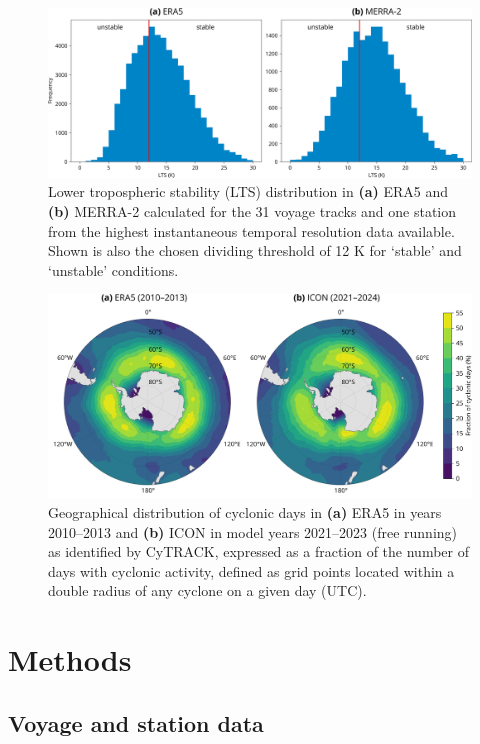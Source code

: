 \documentclass[12pt,a4paper]{article}
\begin{document}
\begin{figure}
\centering
\includegraphics[width=\textwidth]{img/lts_dist.pdf}
\caption{
Lower tropospheric stability (LTS) distribution in \textbf{(a)} ERA5 and
\textbf{(b)} MERRA-2 calculated for the 31 voyage tracks and one station from
the highest instantaneous temporal resolution data available. Shown is also the
chosen dividing threshold of 12 K for `stable' and `unstable' conditions.
}
\label{fig:lts}
\end{figure}

\begin{figure}
\centering
\includegraphics[width=\textwidth]{img/cyc_dist.pdf}
\caption{
Geographical distribution of cyclonic days in \textbf{(a)} ERA5 in years
2010--2013 and \textbf{(b)} ICON in model years 2021--2023 (free running) as
identified by CyTRACK, expressed as a fraction of the number of days with
cyclonic activity, defined as grid points located within a double radius of any
cyclone on a given day (UTC).
}
\label{fig:lts}
\end{figure}

\section{Methods}
\label{sec:methods}

\subsection{Voyage and station data}
\end{document}

